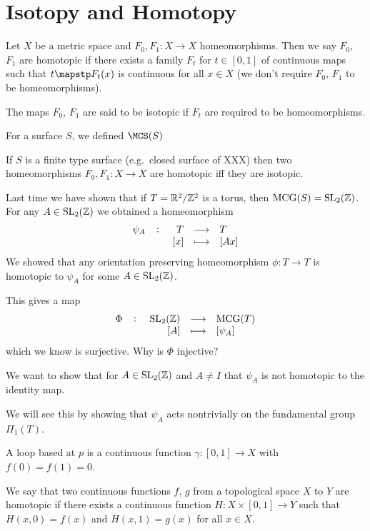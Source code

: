 \documentclass[11pt,a4paper]{article}
\DeclareMathOperator{\MCG}{MCG}
\DeclareMathOperator{\SL}{SL}
\begin{document}
\newpage

\section{Isotopy and Homotopy}
Let $X$ be a metric space and $F_0, F_1 \colon X \to X$ homeomorphisms.
Then we say $F_0$, $F_1$ are homotopic if there exists a family $F_t$
for $t \in [0,1]$ of continuous maps such that $t \mapstp F_t(x)$ is
continuous for all $x \in X$ (we don't require $F_0$, $F_1$ to be 
homeomorphisms).

The maps $F_0$, $F_1$ are said to be isotopic if $F_t$ are required to
be homeomorphisms.

For a surface $S$, we defined $\MCS(S)$

\begin{theorem}
  If $S$ is a finite type surface (e.g.\ closed surface of XXX)
  then two homeomorphisms $F_0, F_1 \colon X \to X$ are homotopic
  iff they are isotopic.
\end{theorem}

Last time we have shown that if $T = \mathbb{R}^2 / \mathbb{Z}^2$ is a torus,
then $\MCG(S) = \SL_2(\Z)$.
For any $A \in \SL_2(\Z)$ we obtained a homeomorphism
\[
  \fullfunction{\psi_A}{T}{T}{[x]}{[Ax]}
\]
We showed that any orientation preserving homeomorphism $\phi \colon T \to T$
is homotopic to $\psi_A$ for some $A \in \SL_2(\Z)$.

This gives a map
\[
  \fullfunction{\Phi}{\SL_2(\Z)}{\MCG(T)}{[A]}{[\psi_A]}
\]
which we know is surjective.
Why is $\Phi$ injective?


We want to show that for $A \in \SL_2(\Z)$ and $A \neq I$ that $\psi_A$
is not homotopic to the identity map.

We will see this by showing that $\psi_A$ acts nontrivially on the fundamental
group $\Pi_1(T)$.

\begin{definition}[Loop]
  A loop based at $p$ is a continuous function $\gamma \colon [0,1] \to X$ with 
  $f(0) = f(1) = 0$.
\end{definition}

\begin{definition}[Homotopy]
  We say that two continuous functions $f$, $g$ from a topological space $X$
  to $Y$ are homotopic if there exists a continuous function 
  $H \colon X \times [0,1] \to Y$ such that $H(x,0) = f(x)$ and
  $H(x,1) = g(x)$ for all $x \in X$.
\end{definition}
\end{document}

